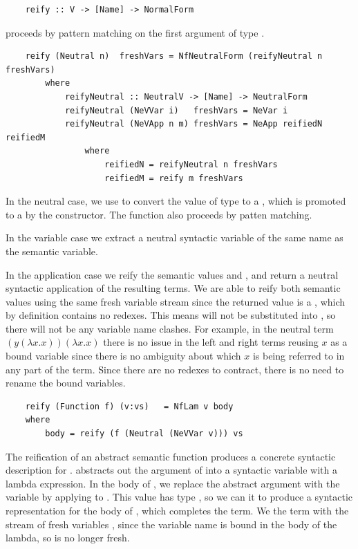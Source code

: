 \begin{lstlisting}
    reify :: V -> [Name] -> NormalForm
\end{lstlisting}

 proceeds by pattern matching on the first argument of type . 

\begin{lstlisting}
    reify (Neutral n)  freshVars = NfNeutralForm (reifyNeutral n freshVars)
        where
            reifyNeutral :: NeutralV -> [Name] -> NeutralForm
            reifyNeutral (NeVVar i)   freshVars = NeVar i
            reifyNeutral (NeVApp n m) freshVars = NeApp reifiedN reifiedM
                where
                    reifiedN = reifyNeutral n freshVars
                    reifiedM = reify m freshVars
\end{lstlisting}

In the neutral case, we use  to convert the value  of type  to a , which is promoted to a  by the  constructor. The  function also proceeds by patten matching. 

In the variable case we extract a neutral syntactic variable of the same name as the semantic variable. 

In the application case we reify the semantic values  and , and return a neutral syntactic application of the resulting terms.
We are able to reify both semantic values using the same fresh variable stream since the returned value is a , which by definition contains no redexes. This means  will not be substituted into , so there will not be any variable name clashes.
For example, in the neutral term $(y(\lambda x.x))(\lambda x . x)$ there is no issue in the left and right terms reusing $x$ as a bound variable since there is no ambiguity about which $x$ is being referred to in any part of the term. Since there are no redexes to contract, there is no need to rename the bound variables.


\begin{lstlisting}
    reify (Function f) (v:vs)   = NfLam v body
    where 
        body = reify (f (Neutral (NeVVar v))) vs
\end{lstlisting}

The reification of an abstract semantic function  produces a concrete syntactic description for .  abstracts out the argument of  into a syntactic variable  with a lambda expression. In the body of , we replace the abstract argument with the variable  by applying  to . This value has type , so we can  it to produce a syntactic representation for the body of , which completes the term. We  the term with the stream of fresh variables , since the variable name  is bound in the body of the lambda, so is no longer fresh.


